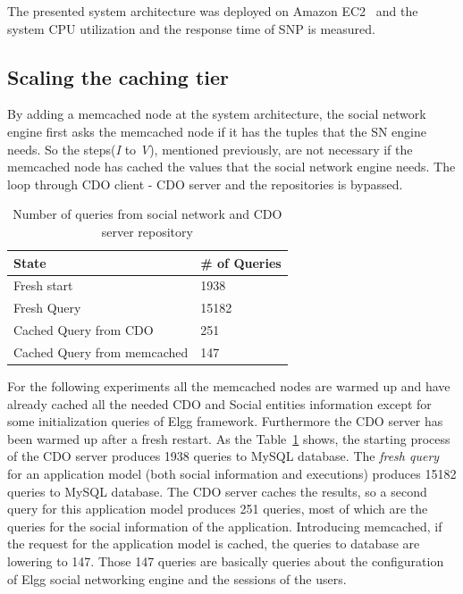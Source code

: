 The presented system architecture was deployed on Amazon EC2~\cite{amazon_url} and the system CPU utilization and the response time of SNP is measured.

\subsection{Scaling the caching tier}
\label{sec:eval_memcache}
By adding a memcached node at the system architecture, the social network engine first asks the memcached node if it has the tuples that the SN engine needs. So the steps(\emph{I} to \emph{V}), mentioned previously, are not necessary if the memcached node has cached the values that the social network engine needs. The loop through CDO client - CDO server and the repositories is bypassed. 

\begin{table}[H]
\centering
\begin{tabular}{|l|l|}
\hline
State        & \# of Queries \\ \hline \hline
Fresh start  & 1938          \\ \hline
Fresh Query  & 15182         \\ \hline
Cached Query from CDO & 251           \\ \hline
Cached Query from memcached & 147 \\ \hline 
\end{tabular}
\caption{Number of queries from social network and CDO server repository}
\label{tab:num_of_queries}
\end{table} 

For the following experiments all the memcached nodes are warmed up and have already cached all the needed CDO and Social entities information except for some initialization queries of Elgg framework. Furthermore the CDO server has been warmed up after a fresh restart. As the Table~\ref{tab:num_of_queries} shows,
the starting process of the CDO server produces 1938 queries to MySQL database. The \emph{fresh query} for an application model (both social information and executions) produces 15182 queries to MySQL database. The CDO server caches the results, so a second query for this application model produces 251 queries, most of which are the queries for the social information of the application. Introducing memcached, if the request for the application model is cached, the queries to database are lowering to 147. Those 147 queries are basically queries about the configuration of Elgg social networking engine and the sessions of the users.

